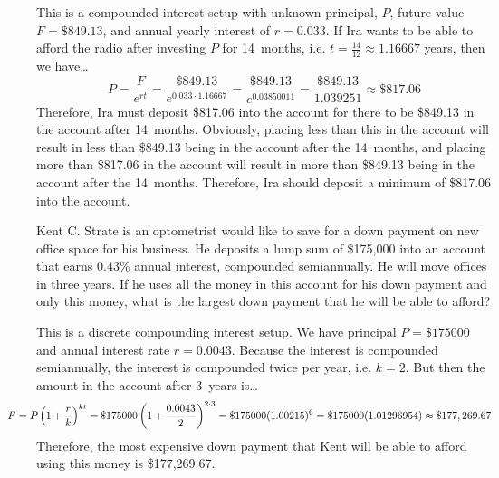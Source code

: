 \documentclass[11pt,letterpaper]{article}
\begin{document}
\sol This is a compounded interest setup with unknown principal, $P$, future value $F= \$849.13$, and annual yearly interest of $r= 0.033$. If Ira wants to be able to afford the radio after investing $P$ for 14~months, i.e. $t= \frac{14}{12} \approx 1.16667$ years, then we have\dots
	\[
	P= \dfrac{F}{e^{rt}}= \dfrac{\$849.13}{e^{0.033 \cdot 1.16667}}= \dfrac{\$849.13}{e^{0.03850011}}= \dfrac{\$849.13}{1.039251} \approx \$817.06
	\]
Therefore, Ira must deposit \$817.06 into the account for there to be \$849.13 in the account after 14~months. Obviously, placing less than this in the account will result in less than \$849.13 being in the account after the 14~months, and placing more than \$817.06 in the account will result in more than \$849.13 being in the account after the 14~months. Therefore, Ira should deposit a minimum of \$817.06 into the account. 



\newpage



 Kent C. Strate is an optometrist would like to save for a down payment on new office space for his business. He deposits a lump sum of \$175,000 into an account that earns 0.43\% annual interest, compounded semiannually. He will move offices in three years. If he uses all the money in this account for his down payment and only this money, what is the largest down payment that he will be able to afford? \pspace

\sol This is a discrete compounding interest setup. We have principal $P= \$175000$ and annual interest rate $r= 0.0043$. Because the interest is compounded semiannually, the interest is compounded twice per year, i.e. $k= 2$. But then the amount in the account after 3~years is\dots
	\[
	\hspace{-1cm} F= P \left(1 + \dfrac{r}{k} \right)^{kt}= \$175000 \left(1 + \dfrac{0.0043}{2} \right)^{2 \cdot 3}= \$175000 (1.00215)^6= \$175000(1.01296954) \approx \$177,269.67
	\]
Therefore, the most expensive down payment that Kent will be able to afford using this money is \$177,269.67.
\end{document}

